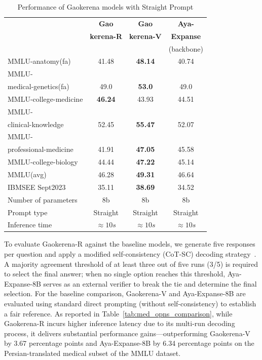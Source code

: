 \documentclass[review]{elsarticle}
\begin{document}
\begin{table}[ht]
		\centering
		\begin{tabular}{|l|c|c|c|}
			\hline
			\textbf{} & \textbf{Gao} & \textbf{Gao} & \textbf{Aya-} \\
			& \textbf{kerena-R} & \textbf{kerena-V} & \textbf{Expanse} \\
			&   & &(backbone)  \\ \hline
			MMLU-anatomy(fa)  & 41.48 & \textbf{48.14}  & 40.74  \\ \hline
			MMLU-&  &  &   \\
            medical-genetics(fa) & 49.0  & \textbf{53.0}  &  49.0 \\ \hline
			MMLU-college-medicine & \textbf{46.24} & 43.93  & 44.51   \\ \hline
			MMLU- &  &   &  \\
            clinical-knowledge & 52.45 & \textbf{55.47}  & 52.07  \\ \hline
            MMLU- &  & &    \\
			professional-medicine& 41.91  & \textbf{47.05}  & 45.58   \\ \hline
			MMLU-college-biology& 44.44 & \textbf{47.22}  &  45.14 \\ \hline
			MMLU(avg) & 46.28 & \textbf{49.31}  & 46.64 \\ \hline
			IBMSEE Sept2023 & 35.11  &\textbf{38.69} & 34.52  \\ \hline
            Number of parameters & 8b & 8b & 8b  \\ \hline
            Prompt type & Straight & Straight & Straight  \\ \hline
			Inference time  & $\approx10s$ & $\approx 10s$ & $\approx 10s$ \\  \hline
		\end{tabular}
		\caption{Performance of Gaokerena models with Straight Prompt}
		\label{tab:med_knowledge_comparison}
\end{table}

To evaluate Gaokerena-R against the baseline models, we generate five responses per question and apply a modified self-consistency (CoT-SC) decoding strategy~\cite{b38}. A majority agreement threshold of at least three out of five runs (3/5) is required to select the final answer; when no single option reaches this threshold, Aya-Expanse-8B serves as an external verifier to break the tie and determine the final selection. For the baseline comparison, Gaokerena-V and Aya-Expanse-8B are evaluated using standard direct prompting (without self-consistency) to establish a fair reference. As reported in Table~\ref{tab:med_opns_comparison}, while Gaokerena-R incurs higher inference latency due to its multi-run decoding process, it delivers substantial performance gains---outperforming Gaokerena-V by 3.67 percentage points and Aya-Expanse-8B by 6.34 percentage points on the Persian-translated medical subset of the MMLU dataset.
\end{document}
